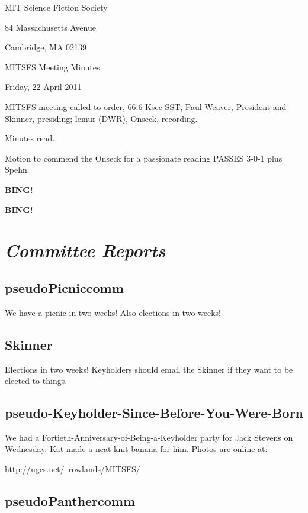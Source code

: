 \documentclass[10pt]{article}
\newcommand{\bing}{{\bf BING!} }
\newcommand{\goto}[1]{\bing \vskip 12pt \section*{{\em{#1}}}}
\newcommand{\ps}{ plus Spehn\xspace}
\newcommand{\skinner}{Paul Weaver, President and Skinner}
\newcommand{\onseck}{lemur (DWR), Onseck}
\newcommand{\meetingdate}{Friday, 22 April 2011}
\begin{document}
\begin{center}

MIT Science Fiction Society

84 Massachusetts Avenue

Cambridge, MA 02139

\vspace{12pt}

MITSFS Meeting Minutes

\meetingdate

\end{center}

\vspace{18pt}

\setlength{\parskip}{6pt}

\noindent
MITSFS meeting called to order, 66.6 Ksec SST,
\skinner, presiding; \onseck, recording.

Minutes read.

Motion to commend the Onseck for a passionate reading PASSES 3-0-1\ps.

\bing

\goto{Committee Reports}

\subsection*{pseudoPicniccomm}

We have a picnic in two weeks!  Also elections in two weeks!

\subsection*{Skinner}

Elections in two weeks!  Keyholders should email the Skinner if they want
to be elected to things.

\subsection*{pseudo-Keyholder-Since-Before-You-Were-Born}

We had a Fortieth-Anniversary-of-Being-a-Keyholder party for Jack Stevens
on Wednesday.  Kat made a neat knit banana for him.  Photos are online at:

http://ugcs.net/~rowlands/MITSFS/

\subsection*{pseudoPanthercomm}
\end{document}
